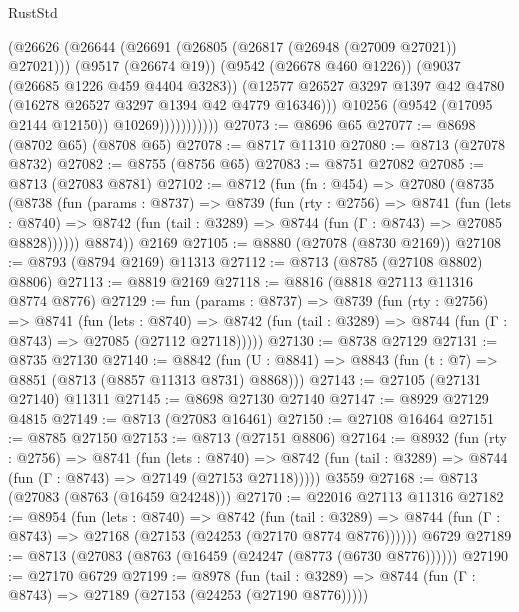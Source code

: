 \begin{lexlean}{RustStd}
\begin{coremodule}
                        (@26626
                          (@26644
                            (@26691 (@26805 (@26817 (@26948 (@27009 @27021)) @27021)))
                            (@9517 (@26674 @19))
                            (@9542 (@26678 @460 @1226))
                            (@9037 (@26685 @1226 @459 @4404 @3283))
                            (@12577
                              @26527
                              @3297
                              @1397
                              @42
                              @4780
                              (@16278 @26527 @3297 @1394 @42 @4779 @16346)))
                          @10256
                          (@9542 (@17095 @2144 @12150))
                          @10269)))))))))))
@27073 := @8696 @65
@27077 := @8698 (@8702 @65) (@8708 @65)
@27078 := @8717 @11310
@27080 := @8713 (@27078 @8732)
@27082 := @8755 (@8756 @65)
@27083 := @8751 @27082
@27085 := @8713 (@27083 @8781)
@27102 := @8712
    (fun (fn : @454) =>
    @27080
      (@8735
        (@8738
          (fun (params : @8737) =>
          @8739
            (fun (rty : @2756) =>
            @8741
              (fun (lets : @8740) =>
              @8742 (fun (tail : @3289) => @8744 (fun (Γ : @8743) => @27085 @8828))))))
        @8874))
    @2169
@27105 := @8880 (@27078 (@8730 @2169))
@27108 := @8793 (@8794 @2169) @11313
@27112 := @8713 (@8785 (@27108 @8802) @8806)
@27113 := @8819 @2169
@27118 := @8816 (@8818 @27113 @11316 @8774 @8776)
@27129 := fun (params : @8737) =>
  @8739
    (fun (rty : @2756) =>
    @8741
      (fun (lets : @8740) =>
      @8742 (fun (tail : @3289) => @8744 (fun (Γ : @8743) => @27085 (@27112 @27118)))))
@27130 := @8738 @27129
@27131 := @8735 @27130
@27140 := @8842
    (fun (U : @8841) => @8843 (fun (t : @7) => @8851 (@8713 (@8857 @11313 @8731) @8868)))
@27143 := @27105 (@27131 @27140) @11311
@27145 := @8698 @27130 @27140
@27147 := @8929 @27129 @4815
@27149 := @8713 (@27083 @16461)
@27150 := @27108 @16464
@27151 := @8785 @27150
@27153 := @8713 (@27151 @8806)
@27164 := @8932
    (fun (rty : @2756) =>
    @8741
      (fun (lets : @8740) =>
      @8742 (fun (tail : @3289) => @8744 (fun (Γ : @8743) => @27149 (@27153 @27118)))))
    @3559
@27168 := @8713 (@27083 (@8763 (@16459 @24248)))
@27170 := @22016 @27113 @11316
@27182 := @8954
    (fun (lets : @8740) =>
    @8742
      (fun (tail : @3289) =>
      @8744 (fun (Γ : @8743) => @27168 (@27153 (@24253 (@27170 @8774 @8776))))))
    @6729
@27189 := @8713 (@27083 (@8763 (@16459 (@24247 (@8773 (@6730 @8776))))))
@27190 := @27170 @6729
@27199 := @8978
    (fun (tail : @3289) => @8744 (fun (Γ : @8743) => @27189 (@27153 (@24253 (@27190 @8776)))))

\end{coremodule}
\end{lexlean}
